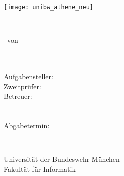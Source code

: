 \begin{center}

\vspace*{1cm}

\texttt{[image: unibw\_athene\_neu]}

\vspace{1.5cm}
{\Huge %
\textbf{\Dtitel}\\ %
} %
\vspace{1.5cm}


{\Large %
\Darbeit \ von\\ %
\Dname\\ %
\Dnummer\\ %
}%
\vspace{2cm}

\parbox{1cm}{
\begin{large}
\begin{tabbing}
Aufgabensteller: \hspace{.5cm} \= \Dprofa \\[2mm]
Zweitprüfer: \> \Dprofb \\[2mm]
Betreuer:
\> \Dbetreuera \\ %
\> \Dbetreuerb \\
\> \Dbetreuerc \\[5mm]
Abgabetermin: \> \Dday \\
\end{tabbing}
\end{large}}\\
\vspace{5mm}

\vfill

{\Large %
Universität der Bundeswehr München\\
Fakultät für Informatik\\
}

\end{center}
